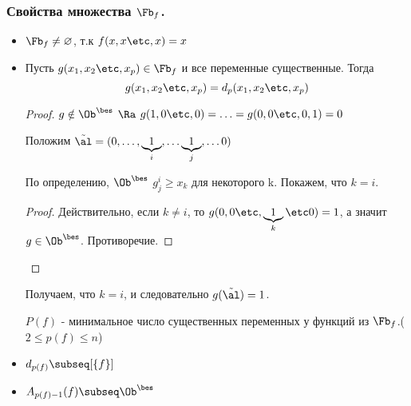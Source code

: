 \documentclass[unicode, 10pt, a4paper, oneside, fleqn]{article}
\begin{document}
\subsubsection{Свойства множества $\Ff$.}
\begin{itemize}
  \item $\Ff\ne\varnothing$, т.к $f(x,x\etc,x) = x$ \THEN
  \item 
    \begin{lemma}
      Пусть $g(x_1,x_2\etc,x_p) \in \Ff$ и все переменные существенные. 
      Тогда 
      \begin{displaymath}
        g(\set[x]{p}) = d_p(\set[x]{p})
      \end{displaymath}
    \end{lemma}
    \begin{proof}
      $g \notin \Oib$ $\Ra$ $g(1,0\etc,0)= \ldots =g(0,0\etc,0,1)=0$
      \WHY
      \par  Положим $\tilde \al = (0,\ldots,\underbrace{1}_i,\ldots\underbrace{1}_j,\ldots0)$
      \begin{stm}
        По определению, $\Oib$ $g^i_j\ge x_k$ для некоторого k. Покажем, что   $k=i$.
      \end{stm}
      \begin{proof}
        Действительно, если $k\neq i$, то $g(0,0\etc,\underbrace{1}_k\etc0) = 1$, а значит $g\in\Oib$. Противоречие.
      \end{proof}
      \THEN
    \end{proof}
    \begin{imp}
      Получаем, что $k=i$, и следовательно \WHY $g(\tilde \al)=1$.
    \end{imp}
    \begin{df}
      $P(f)$ - минимальное число существенных переменных у функций из $\Ff$.($2\le p(f)\le n$)
    \end{df}
  \item $d_{p(f)}\subseq\cls{f}$
  \item $A_{p(f)-1}(f)\subseq\Oib$
\end{itemize}
\end{document}
